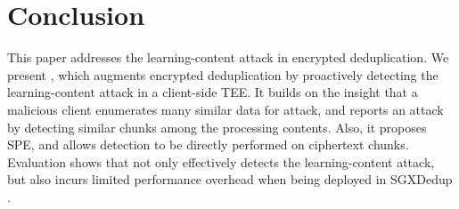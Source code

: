 \section{Conclusion}
\label{sec:conclusion}
This paper addresses the learning-content attack in encrypted deduplication. We present \sysnameF, which augments  encrypted deduplication by proactively detecting the learning-content attack in a client-side TEE. It
builds on the insight that a malicious client enumerates many similar data for attack, and reports an attack by detecting similar chunks among the processing contents. Also, it proposes SPE, and allows detection  to be directly performed on ciphertext chunks.
Evaluation shows that \sysnameF not only effectively detects the learning-content attack, but also incurs limited performance overhead when being deployed in SGXDedup \cite{ren21}.
